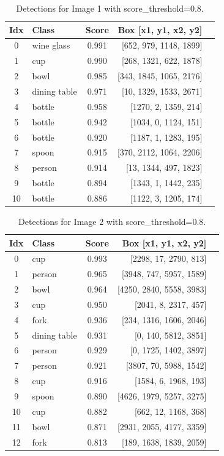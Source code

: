 \documentclass[11pt]{article}
\begin{document}
\begin{table}[H]
  \centering
  \caption{Detections for Image 1 with score\_threshold=0.8.}
  \label{tab:det1}
  \small
  \begin{tabular}{clcrl}
    \toprule
    Idx & Class & Score & Box [x1, y1, x2, y2] \\
    \midrule
    0 & wine glass & 0.991 & [652, 979, 1148, 1899] \\
    1 & cup & 0.990 & [268, 1321, 622, 1878] \\
    2 & bowl & 0.985 & [343, 1845, 1065, 2176] \\
    3 & dining table & 0.971 & [10, 1329, 1533, 2671] \\
    4 & bottle & 0.958 & [1270, 2, 1359, 214] \\
    5 & bottle & 0.942 & [1034, 0, 1124, 151] \\
    6 & bottle & 0.920 & [1187, 1, 1283, 195] \\
    7 & spoon & 0.915 & [370, 2112, 1064, 2206] \\
    8 & person & 0.914 & [13, 1344, 497, 1823] \\
    9 & bottle & 0.894 & [1343, 1, 1442, 235] \\
    10 & bottle & 0.886 & [1122, 3, 1205, 174] \\
    \bottomrule
  \end{tabular}
\end{table}

\begin{table}[H]
  \centering
  \caption{Detections for Image 2 with score\_threshold=0.8.}
  \label{tab:det2}
  \small
  \begin{tabular}{clcrl}
    \toprule
    Idx & Class & Score & Box [x1, y1, x2, y2] \\
    \midrule
    0 & cup & 0.993 & [2298, 17, 2790, 813] \\
    1 & person & 0.965 & [3948, 747, 5957, 1589] \\
    2 & bowl & 0.964 & [4250, 2840, 5558, 3983] \\
    3 & cup & 0.950 & [2041, 8, 2317, 457] \\
    4 & fork & 0.936 & [234, 1316, 1606, 2046] \\
    5 & dining table & 0.931 & [0, 140, 5812, 3851] \\
    6 & person & 0.929 & [0, 1725, 1402, 3897] \\
    7 & person & 0.921 & [3807, 70, 5988, 1542] \\
    8 & cup & 0.916 & [1584, 6, 1968, 193] \\
    9 & spoon & 0.890 & [4626, 1979, 5257, 3275] \\
    10 & cup & 0.882 & [662, 12, 1168, 368] \\
    11 & bowl & 0.871 & [2931, 2055, 4177, 3359] \\
    12 & fork & 0.813 & [189, 1638, 1839, 2059] \\
    \bottomrule
  \end{tabular}
\end{table}
\end{document}
